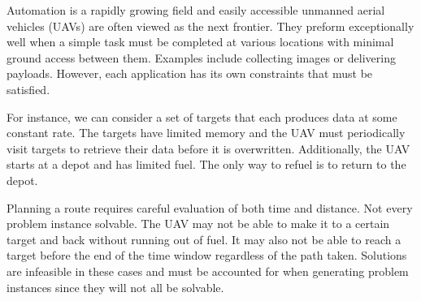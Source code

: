 Automation is a rapidly growing field and easily accessible unmanned aerial vehicles (UAVs) are often viewed as the next frontier. They preform exceptionally well when a simple task must be completed at various locations with minimal ground access between them. 
Examples include collecting images or delivering payloads. However, each application has its own constraints that must be satisfied.

For instance, we can consider a set of targets that each produces data at some constant rate. The targets have limited memory and the UAV must periodically visit targets to retrieve their data before it is overwritten. Additionally, the UAV starts at a depot and has limited fuel. The only way to refuel is to return to the depot.

Planning a route requires careful evaluation of both time and distance. Not every problem instance solvable. The UAV may not be able to make it to a certain target and back without running out of fuel. It may also not be able to reach a target before the end of the time window regardless of the path taken. Solutions are infeasible in these cases and must be accounted for when generating problem instances since they will not all be solvable.